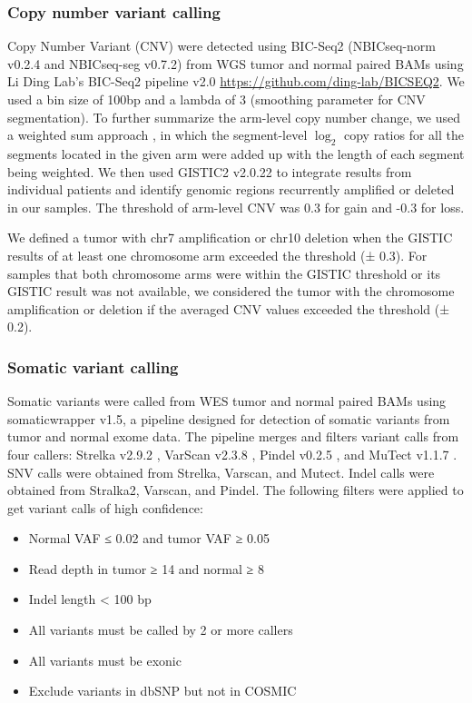 \subsubsection{Copy number variant calling}
Copy Number Variant (CNV) were detected using BIC-Seq2 (NBICseq-norm v0.2.4 and NBICseq-seg v0.7.2) \cite{xir_parkpj:CopyNumber2016} from WGS tumor and normal paired BAMs using Li Ding Lab’s BIC-Seq2 pipeline v2.0 \url{https://github.com/ding-lab/BICSEQ2}. We used a bin size of 100bp and a lambda of 3 (smoothing parameter for CNV segmentation). To further summarize the arm-level copy number change, we used a weighted sum approach \cite{vasaikars_cptac:ProteogenomicAnalysis2019}, in which the segment-level $\log_2$ copy ratios for all the segments located in the given arm were added up with the length of each segment being weighted. We then used GISTIC2 v2.0.22 \cite{mermelch_getzg:GISTIC2Facilitates2011} to integrate results from individual patients and identify genomic regions recurrently amplified or deleted in our samples. The threshold of arm-level CNV was 0.3 for gain and -0.3 for loss.

We defined a tumor with chr7 amplification or chr10 deletion when the GISTIC results of at least one chromosome arm exceeded the threshold (± 0.3). For samples that both chromosome arms were within the GISTIC threshold or its GISTIC result was not available, we considered the tumor with the chromosome amplification or deletion if the averaged CNV values exceeded the threshold (± 0.2).

\subsubsection{Somatic variant calling}
Somatic variants were called from WES tumor and normal paired BAMs using somaticwrapper v1.5, a pipeline designed for detection of somatic variants from tumor and normal exome data. The pipeline merges and filters variant calls from four callers: Strelka v2.9.2 \cite{kims_saundersct:Strelka2Fast2018}, VarScan v2.3.8 \cite{koboldtdc_wilsonrk:VarScan22012}, Pindel v0.2.5 \cite{yek_ningz:Pindel2009}, and MuTect v1.1.7 \cite{cibulskisk_getzg:SensitiveDetection2013}. SNV calls were obtained from Strelka, Varscan, and Mutect. Indel calls were obtained from Stralka2, Varscan, and Pindel. The following filters were applied to get variant calls of high confidence:

\begin{itemize}
    \tightlist
    \item Normal VAF ≤ 0.02 and tumor VAF ≥ 0.05
    \item Read depth in tumor ≥ 14 and normal ≥ 8
    \item Indel length < 100 bp
    \item All variants must be called by 2 or more callers
    \item All variants must be exonic
    \item Exclude variants in dbSNP but not in COSMIC
\end{itemize}

